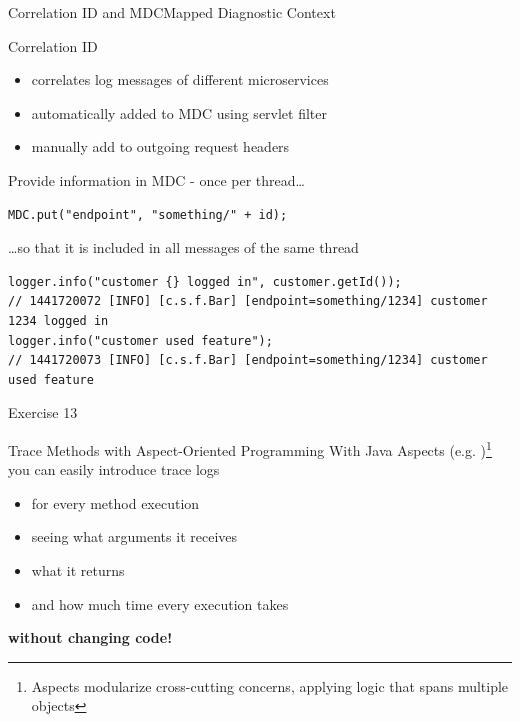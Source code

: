 \begin{frame}[fragile]{Correlation ID and MDC}{Mapped Diagnostic Context}
    \begin{block}{Correlation ID}
        \begin{itemize}
            \item correlates log messages of different microservices
            \item automatically added to MDC using servlet filter
            \item manually add to outgoing request headers
        \end{itemize}
    \end{block}

    \vfill

    Provide information in MDC - once per thread\ldots{}
    \begin{lstlisting}
MDC.put("endpoint", "something/" + id);
    \end{lstlisting}
    \ldots{}so that it is included in all messages of the same thread

    \begin{lstlisting}
logger.info("customer {} logged in", customer.getId());
// 1441720072 [INFO] [c.s.f.Bar] [endpoint=something/1234] customer 1234 logged in
logger.info("customer used feature");
// 1441720073 [INFO] [c.s.f.Bar] [endpoint=something/1234] customer used feature
    \end{lstlisting}

\end{frame}


\begin{frame}{Exercise 13}
\end{frame}

\begin{frame}[fragile]{Trace Methods with Aspect-Oriented Programming}
With Java Aspects (e.g. )\footnote{Aspects modularize cross-cutting concerns, applying logic that spans multiple objects} you can easily introduce trace logs 
\begin{itemize}
\item for every method execution
\item seeing what arguments it receives
\item what it returns 
\item and how much time every execution takes
\end{itemize}
\textbf{without changing code!}

\vfill
{}
\end{frame}

